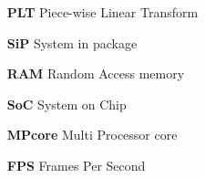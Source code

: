 \begin{itemize}
\item[\textbf{PLT}]  \hspace{0.5cm}	Piece-wise Linear Transform
\item[\textbf{SiP}]  \hspace{0.5cm}	System in package
\item[\textbf{RAM}]  \hspace{0.5cm}	Random Access memory
\item[\textbf{SoC}] \hspace{0.5cm}	System on Chip
\item[\textbf{MPcore}] \hspace{0.5cm}	Multi Processor core
\item[\textbf{FPS}] \hspace{0.5cm}	Frames Per Second
\end{itemize}